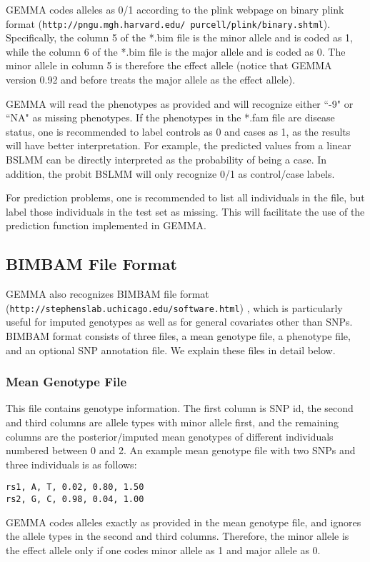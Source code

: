 \documentclass[11pt]{article}
\providecommand{\url}[1]{\texttt{#1}}
\begin{document}
GEMMA codes alleles as 0/1 according to the plink webpage on binary plink format (\url{http://pngu.mgh.harvard.edu/~purcell/plink/binary.shtml}). Specifically, the column 5 of the *.bim file is the minor allele and is coded as 1, while the column 6 of the *.bim file is the major allele and is coded as 0. The minor allele in column 5 is therefore the effect allele (notice that GEMMA version 0.92 and before treats the major allele as the effect allele).

GEMMA will read the phenotypes as provided and will recognize either ``-9" or ``NA" as missing phenotypes. If the phenotypes in the *.fam file are disease status, one is recommended to label controls as 0 and cases as 1, as the results will have better interpretation. For example, the predicted values from a linear BSLMM can be directly interpreted as the probability of being a case.  In addition, the probit BSLMM will only recognize 0/1 as control/case labels.

For prediction problems, one is recommended to list all individuals in the file, but label those individuals in the test set as missing. This will facilitate the use of the prediction function implemented in GEMMA. 

\subsection{BIMBAM File Format}
GEMMA also recognizes BIMBAM file format (\url{http://stephenslab.uchicago.edu/software.html}) \cite{Guan:2008}, which is particularly useful for imputed genotypes as well as for general covariates other than SNPs. BIMBAM format consists of three files, a mean genotype file, a phenotype file, and an optional SNP annotation file. We explain these files in detail below.

\subsubsection{Mean Genotype File}
This file contains genotype information. The first column is SNP id, the second and third columns are allele types with minor allele first, and the remaining columns are the posterior/imputed mean genotypes of different individuals numbered between 0 and 2. An example mean genotype file with two SNPs and three individuals is as follows:
%
\begin{verbatim}
rs1, A, T, 0.02, 0.80, 1.50
rs2, G, C, 0.98, 0.04, 1.00
\end{verbatim}
%
GEMMA codes alleles exactly as provided in the mean genotype file, and ignores the allele types in the second and third columns. Therefore, the minor allele is the effect allele only if one codes minor allele as 1 and major allele as 0. 
\end{document}
